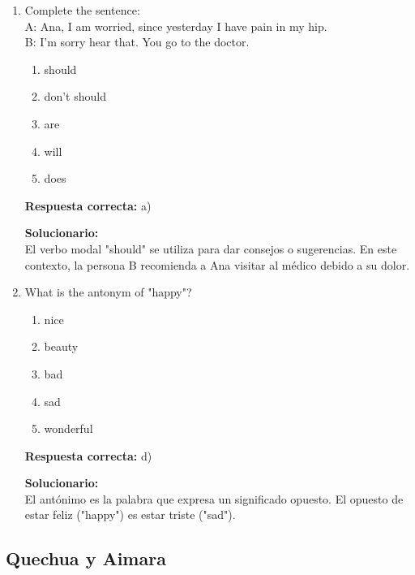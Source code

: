 \begin{enumerate}
	
	\item Complete the sentence: \\
	A: Ana, I am worried, since yesterday I have pain in my hip. \\
	B: I'm sorry hear that. You \underline{\hspace{2cm}} go to the doctor.
	\begin{enumerate}[label=\alph*)]
		\item should
		\item don't should
		\item are
		\item will
		\item does
	\end{enumerate}
	\textbf{Respuesta correcta:} a)
	
	\vspace{2mm}
	\textbf{Solucionario:}\\
	El verbo modal "should" se utiliza para dar consejos o sugerencias. En este contexto, la persona B recomienda a Ana visitar al médico debido a su dolor.
	
	\vspace{6mm}
	
	\item What is the antonym of "happy"?
	\begin{enumerate}[label=\alph*)]
		\item nice
		\item beauty
		\item bad
		\item sad
		\item wonderful
	\end{enumerate}
	\textbf{Respuesta correcta:} d)
	
	\vspace{2mm}
	\textbf{Solucionario:}\\
	El antónimo es la palabra que expresa un significado opuesto. El opuesto de estar feliz ("happy") es estar triste ("sad").
	
	\vspace{6mm}
	
\end{enumerate}

\subsection*{Quechua y Aimara}

